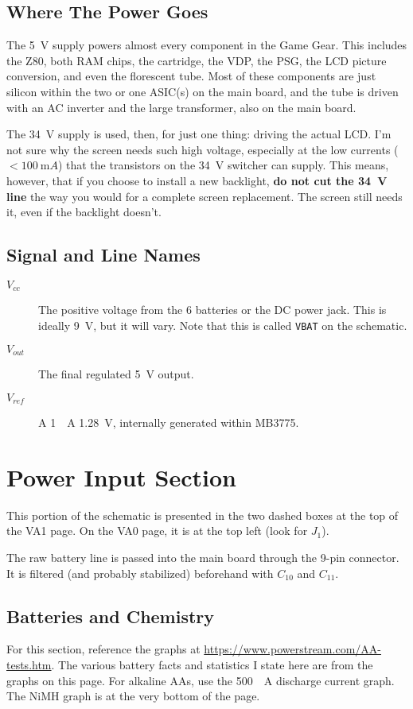 \documentclass{article}
\newcommand{\Vcc}{$V_{cc}$}
\newcommand{\Vout}{$V_{out}$}
\newcommand{\Vref}{$V_{ref}$}
\newcommand{\model}{\textsf}
\begin{document}
\subsection{Where The Power Goes}
The \qty{5}{\volt} supply powers almost every component in the Game
Gear. This includes the \model{Z80}, both RAM chips, the cartridge,
the VDP, the PSG, the LCD picture conversion, and even the florescent
tube. Most of these components are just silicon within the two or one
ASIC(s) on the main board, and the tube is driven with an AC inverter
and the large transformer, also on the main board.

The \qty{34}{\volt} supply is used, then, for just one thing: driving
the actual LCD. I'm not sure why the screen needs such high voltage,
especially at the low currents ($<\qty{100}{\milli{}A}$) that the
transistors on the \qty{34}{\volt} switcher can supply. This means,
however, that if you choose to install a new backlight, \textbf{do not
  cut the \qty{34}{\volt} line} the way you would for a complete
screen replacement. The screen still needs it, even if the backlight
doesn't.

\subsection{Signal and Line Names}
\begin{description}
\item[\Vcc{}] The positive voltage from the 6 batteries or the DC power
  jack. This is ideally \qty{9}{\volt}, but it will vary. Note that
  this is called \texttt{VBAT} on the schematic.
\item[\Vout{}] The final regulated \qty{5}{\volt} output.
\item[\Vref{}] A \qty{1}{\milli{}A} \qty{1.28}{\volt}, internally
  generated within \model{MB3775}.
\end{description}

\section{Power Input Section}
This portion of the schematic is presented in the two dashed boxes at
the top of the \model{VA1} page. On the \model{VA0} page, it is at the
top left (look for $J_1$).

The raw battery line is passed into the main board through the 9-pin
connector. It is filtered (and probably stabilized) beforehand with
$C_{10}$ and $C_{11}$.

\subsection{Batteries and Chemistry}
For this section, reference the graphs at
\url{https://www.powerstream.com/AA-tests.htm}. The various battery
facts and statistics I state here are from the graphs on this
page. For alkaline AAs, use the \qty{500}{\milli{}A} discharge current
graph. The NiMH graph is at the very bottom of the page.
\end{document}

